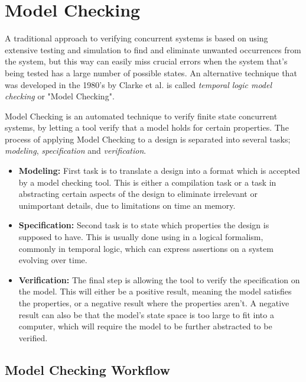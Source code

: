 \section{Model Checking}

A traditional approach to verifying concurrent systems is based on using extensive testing and simulation to find and eliminate unwanted occurrences from the system, but this way can easily miss crucial errors when the system that's being tested has a large number of possible states\cite{clarke1999model}. An alternative technique that was developed in the 1980's by Clarke et al. is called \textit{temporal logic model checking} or "Model Checking".

Model Checking is an automated technique to verify finite state concurrent systems, by letting a tool verify that a model holds for certain properties. The process of applying Model Checking to a design is separated into several tasks; \textit{modeling}, \textit{specification} and \textit{verification}. \\

\begin{itemize}
	\item[] \textbf{Modeling:} First task is to translate a design into a format which is accepted by a model checking tool. This is either a compilation task or a task in abstracting certain aspects of the design to eliminate irrelevant or unimportant details, due to limitations on time an memory. \\
	\item[] \textbf{Specification:} Second task is to state which properties the design is supposed to have. This is usually done using in a logical formalism, commonly in temporal logic, which can express assertions on a system evolving over time. \\
	\item[] \textbf{Verification:} The final step is allowing the tool to verify the specification on the model. This will either be a positive result, meaning the model satisfies the properties, or a negative result where the properties aren't. A negative result can also be that the model's state space is too large to fit into a computer, which will require the model to be further abstracted to be verified.
\end{itemize}


\subsection{Model Checking Workflow}

